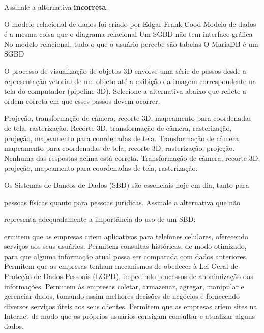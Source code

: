 \documentclass[12pt, addpoints]{exam}
\begin{document}
\begin{questions}
\question Assinale a alternativa \textbf{incorreta}:
\begin{choices}
\choice O modelo relacional de dados foi criado por Edgar Frank Cood
\choice Modelo de dados é a mesma coisa que o diagrama relacional
\choice Um SGBD não tem interface gráfica
\choice No modelo relacional, tudo o que o usuário percebe são tabelas
\choice O MariaDB é um SGBD
\end{choices}

\question

O processo de visualização de objetos 3D envolve uma série de passos desde a representação vetorial de um objeto até a exibição da imagem correspondente na tela do computador (pipeline 3D). Selecione a alternativa abaixo que reflete a ordem correta em que esses passos devem ocorrer. 
\begin{choices}
\choice Projeção, transformação de câmera, recorte 3D, mapeamento para coordenadas de tela, rasterização. 
\choice Recorte 3D, transformação de câmera, rasterização, projeção, mapeamento para coordenadas de tela. 
\choice Transformação de câmera, mapeamento para coordenadas de tela, recorte 3D, rasterização, projeção. 
\choice Nenhuma das respostas acima está correta.
\choice Transformação de câmera, recorte 3D, projeção, mapeamento para coordenadas de tela, rasterização. 
\end{choices}

\question

Os Sistemas de Bancos de Dados (SBD) são essenciais hoje em dia, tanto para

pessoas físicas quanto para pessoas jurídicas. Assinale a alternativa que não

representa adequadamente a importância do uso de um SBD:
\begin{choices}
\choice ermitem que as empresas criem aplicativos para telefones celulares, oferecendo serviços aos seus usuários.
\choice Permitem consultas históricas, de modo otimizado, para que alguma informação atual possa ser comparada com dados anteriores.
\choice Permitem que as empresas tenham mecanismos de obedecer à Lei Geral de Proteção de Dados Pessoais (LGPD), impedindo processos de anonimização das informações.
\choice Permitem às empresas coletar, armazenar, agregar, manipular e gerenciar dados, tomando assim melhores decisões de negócios e fornecendo diversos serviços úteis aos seus clientes.
\choice Permitem que as empresas criem sites na Internet de modo que os próprios usuários consigam consultar e atualizar alguns dados.
\end{choices}


\end{questions}
\end{document}
